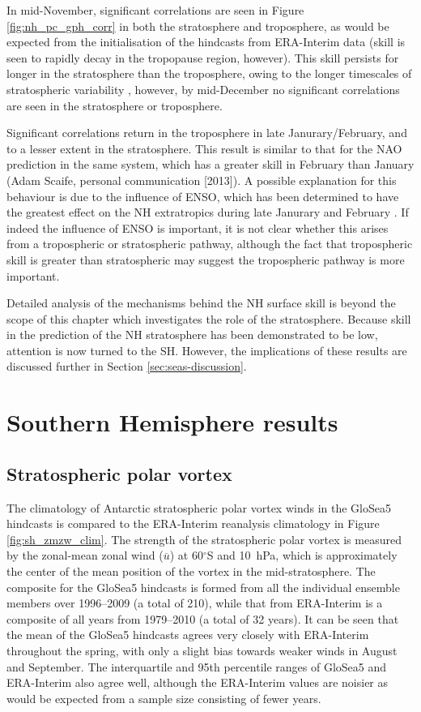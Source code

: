 In mid-November, significant correlations are seen in Figure
\ref{fig:nh_pc_gph_corr} in both the stratosphere and troposphere, as would be
expected from the initialisation of the hindcasts from ERA-Interim data (skill
is seen to rapidly decay in the tropopause region, however). This skill persists
for longer in the stratosphere than the troposphere, owing to the longer
timescales of stratospheric variability \citep[e.g.,][]{Simpson2011}, however,
by mid-December no significant correlations are seen in the stratosphere or
troposphere. 

Significant correlations return in the troposphere in late Janurary/February,
and to a lesser extent in the stratosphere. This result is similar to that for
the NAO prediction in the same system, which has a greater skill in February
than January (Adam Scaife, personal communication [2013]). A possible
explanation for this behaviour is due to the influence of ENSO, which has been
determined to have the greatest effect on the NH extratropics during late
Janurary and February \citep{Bell2009}. If indeed the influence of ENSO is
important, it is not clear whether this arises from a tropospheric or
stratospheric pathway, although the fact that tropospheric skill is greater than
stratospheric may suggest the tropospheric pathway is more important. 

Detailed analysis of the mechanisms behind the NH surface skill is beyond the
scope of this chapter which investigates the role of the stratosphere. Because
skill in the prediction of the NH stratosphere has been demonstrated to be low,
attention is now turned to the SH. However, the implications of these results
are discussed further in Section \ref{sec:seas-discussion}. 


\section{Southern Hemisphere results}
\label{sec:south-hemisph-result}

\subsection{Stratospheric polar vortex}


The climatology of Antarctic stratospheric polar vortex winds in the GloSea5
hindcasts is compared to the ERA-Interim reanalysis climatology in Figure
\ref{fig:sh_zmzw_clim}. The strength of the stratospheric polar vortex is
measured by the zonal-mean zonal wind ($\overline{u}$) at 60$^{\circ}$S and
10~hPa, which is approximately the center of the mean position of the vortex in
the mid-stratosphere. The composite for the GloSea5 hindcasts is formed from all
the individual ensemble members over 1996--2009 (a total of 210), while that
from ERA-Interim is a composite of all years from 1979--2010 (a total of 32
years). It can be seen that the mean of the GloSea5 hindcasts agrees very
closely with ERA-Interim throughout the spring, with only a slight bias towards
weaker winds in August and September. The interquartile and 95th percentile
ranges of GloSea5 and ERA-Interim also agree well, although the ERA-Interim
values are noisier as would be expected from a sample size consisting of fewer
years.

